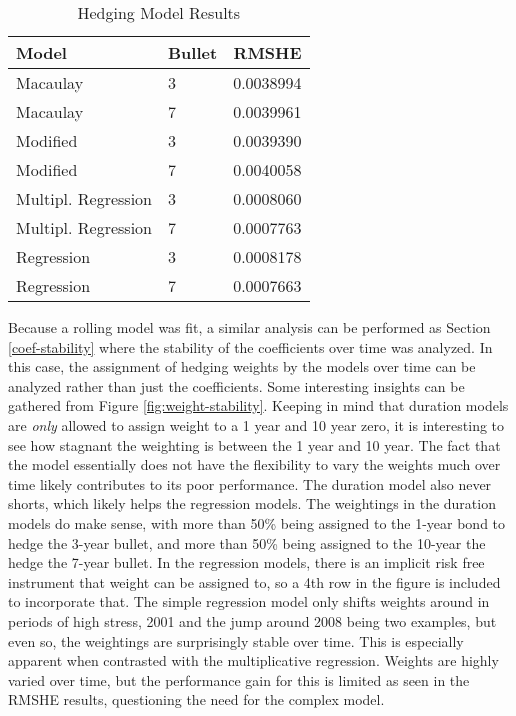 \documentclass[openany]{book}
\theoremstyle{definition}
\theoremstyle{definition}
\theoremstyle{definition}
\theoremstyle{remark}
\begin{document}
\small

\begin{table}[H]

\caption{\label{tab:hedging-results}Hedging Model Results}
\centering
\begin{tabular}[t]{llr}
\toprule
Model & Bullet & RMSHE\\
\midrule
Macaulay & 3 & 0.0038994\\
Macaulay & 7 & 0.0039961\\
Modified & 3 & 0.0039390\\
Modified & 7 & 0.0040058\\
Multipl. Regression & 3 & 0.0008060\\
\addlinespace
Multipl. Regression & 7 & 0.0007763\\
Regression & 3 & 0.0008178\\
Regression & 7 & 0.0007663\\
\bottomrule
\end{tabular}
\end{table}

\normalsize

\small

\normalsize

Because a rolling model was fit, a similar analysis can be performed as
Section \ref{coef-stability} where the stability of the coefficients
over time was analyzed. In this case, the assignment of hedging weights
by the models over time can be analyzed rather than just the
coefficients. Some interesting insights can be gathered from Figure
\ref{fig:weight-stability}. Keeping in mind that duration models are
\emph{only} allowed to assign weight to a 1 year and 10 year zero, it is
interesting to see how stagnant the weighting is between the 1 year and
10 year. The fact that the model essentially does not have the
flexibility to vary the weights much over time likely contributes to its
poor performance. The duration model also never shorts, which likely
helps the regression models. The weightings in the duration models do
make sense, with more than 50\% being assigned to the 1-year bond to
hedge the 3-year bullet, and more than 50\% being assigned to the
10-year the hedge the 7-year bullet. In the regression models, there is
an implicit risk free instrument that weight can be assigned to, so a
4th row in the figure is included to incorporate that. The simple
regression model only shifts weights around in periods of high stress,
2001 and the jump around 2008 being two examples, but even so, the
weightings are surprisingly stable over time. This is especially
apparent when contrasted with the multiplicative regression. Weights are
highly varied over time, but the performance gain for this is limited as
seen in the RMSHE results, questioning the need for the complex model.
\end{document}
